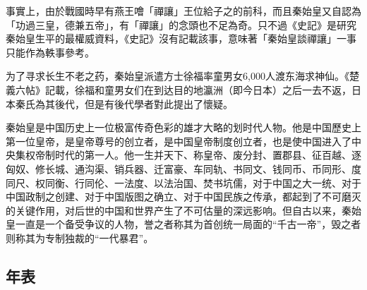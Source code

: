 事實上，由於戰國時早有燕王噲「禪讓」王位給子之的前科，而且秦始皇又自認為「功過三皇，德兼五帝」，有「禪讓」的念頭也不足為奇。只不過《史記》是研究秦始皇生平的最權威資料，《史記》沒有記載該事，意味著「秦始皇談禪讓」一事只能作為軼事參考。

为了寻求长生不老之药，秦始皇派遣方士徐福率童男女6,000人渡东海求神仙。《楚義六帖》記載，徐福和童男女们在到达目的地瀛洲（即今日本）之后一去不返，日本秦氏為其後代，但是有後代學者對此提出了懷疑。

秦始皇是中国历史上一位极富传奇色彩的雄才大略的划时代人物。他是中国歷史上第一位皇帝，是皇帝尊号的创立者，是中国皇帝制度创立者，也是使中国进入了中央集权帝制时代的第一人。他一生并天下、称皇帝、废分封、置郡县、征百越、逐匈奴、修长城、通沟渠、销兵器、迁富豪、车同轨、书同文、钱同币、币同形、度同尺、权同衡、行同伦、一法度、以法治国、焚书坑儒，对于中国之大一统、对于中国政制之创建、对于中国版图之确立、对于中国民族之传承，都起到了不可磨灭的关键作用，对后世的中国和世界产生了不可估量的深远影响。但自古以来，秦始皇一直是一个备受争议的人物，誉之者称其为首创统一局面的“千古一帝”，毁之者则称其为专制独裁的“一代暴君”。

\subsection{年表}



